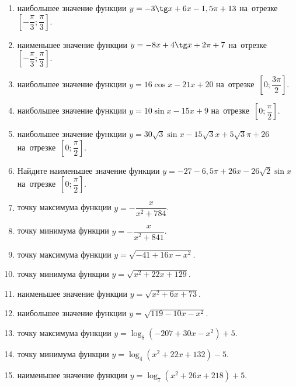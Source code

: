 \documentclass[a4paper,10pt]{article}
\begin{document}
\begin{enumerate}
\item {} наибольшее значение функции $y=-3\tg x +6x-1,5\pi +13$ на~отрезке~$\left[-\dfrac{\pi}{3};\dfrac{\pi}{3}\right]$.

\item {} наименьшее значение функции $y=-8x +4\tg x+2\pi+7$ на~отрезке~$\left[-\dfrac{\pi}{3};\dfrac{\pi}{3}\right]$.

\item {} наибольшее значение функции $y=16\cos x-21x+20$ на~отрезке~$\left[0;\dfrac{3\pi}{2}\right]$.

\item {} наибольшее значение функции $y=10\sin x-15x+9$ на~отрезке~$\left[0;\dfrac{\pi}{2}\right]$.

\item {} наибольшее значение функции $y=30\sqrt{3}\sin x-15\sqrt{3}x+5\sqrt{3}\pi +26$ на~отрезке~$\left[0;\dfrac{\pi}{2}\right]$.

\item Найдите наименьшее значение функции $y=-27-6,5\pi+26x-26\sqrt{2}\sin x$ на~отрезке~$\left[0;\dfrac{\pi}{2}\right]$.

\item {} точку максимума функции $y=-\dfrac{x}{ x^2 +784}$.

\item {} точку минимума функции $y=-\dfrac{x}{ x^2 +841}$.

\item {} точку максимума функции $y=\sqrt{-41+16x-x^2}$.

\item {} точку минимума функции $y=\sqrt{x^2+22x+129}$.

\item {} наименьшее значение функции $y=\sqrt{x^2+6x+73}$.

\item {} наибольшее значение функции $y=\sqrt{119-10x-x^2}$.

\item {} точку максимума функции $y=\log_8\left(-207+30x-x^2\right)+5$.

\item {} точку минимума функции $y=\log_4\left(x^2+22x+132\right)-5$.

\item {} наименьшее значение функции $y=\log_7\left(x^2+26x+218\right)+5$.


\end{enumerate}
\end{document}
